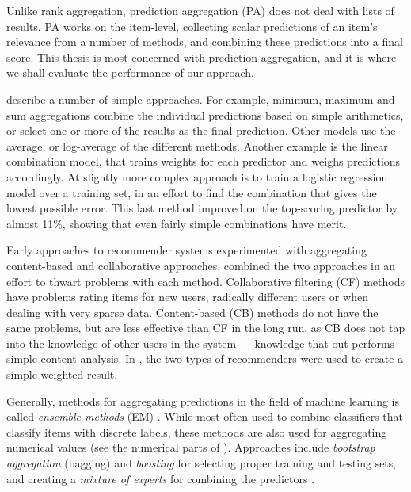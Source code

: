 Unlike rank aggregation, prediction aggregation (PA) does not deal with lists of results.
PA works on the item-level, collecting scalar predictions of an item's relevance from a number of methods,
and combining these predictions into a final score.
This thesis is most concerned with prediction aggregation,
and it is where we shall evaluate the performance of our approach.

\cite{Aslam2001} describe a number of simple approaches.
For example, minimum, maximum and sum aggregations combine the individual 
predictions based on simple arithmetics, 
or select one or more of the results as the final prediction. 
Other models use the average, or log-average of the different methods.
Another example is the linear combination model, that trains weights for each predictor and weighs predictions accordingly.
At slightly more complex approach is to train a logistic regression model \cite[p3]{Aslam2001}
over a training set, in an effort to find the combination that gives the lowest possible error.
This last method improved on the top-scoring predictor by almost 11\%,
showing that even fairly simple combinations have merit.

Early approaches to recommender systems experimented with aggregating content-based and collaborative approaches.
\cite{Claypool1999} combined the two approaches in an effort to thwart problems with each method.
Collaborative filtering (CF) methods have problems rating items for new users, radically different users or when dealing with very sparse data.
Content-based (CB) methods do not have the same problems, but are less effective than CF in the long run, as CB does not tap into the 
knowledge of other users in the system --- knowledge that out-performs simple content analysis.
In \cite{Claypool1999}, the two types of recommenders were used to create a simple weighted result.

Generally, methods for aggregating predictions in the field of machine learning is called \emph{ensemble methods} (EM) \cite{Dietterich2000}.
While most often used to combine classifiers that classify items with discrete labels,
these methods are also used for aggregating numerical values (see the numerical parts of \cite{Breiman1996}).
Approaches include \emph{bootstrap aggregation} (bagging) and \emph{boosting} 
for selecting proper training and testing sets,
and creating a \emph{mixture of experts} for combining the predictors
\cite[p27]{Polikar2006}.


